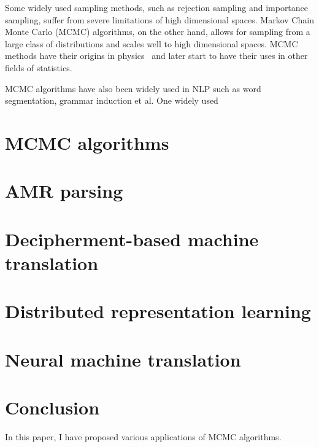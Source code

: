 \documentclass[12pt,leqno]{report}
\begin{document}
\begin{CJK}{UTF8}{cyberbit}
Some widely used sampling methods, such as rejection sampling and importance sampling, suffer from severe limitations of high dimensional spaces. Markov Chain Monte Carlo (MCMC)
algorithms, on the other hand, allows for sampling from a large class of distributions and scales well to high dimensional spaces. MCMC methods have their origins in physics~\cite{metropolis1949monte} and later start to have
their uses in other fields of statistics.


MCMC algorithms have also been widely used in NLP such as word segmentation, grammar induction et al. One widely used 
\break

\chapter{MCMC algorithms}
\label{chap:MCMC}

\break

\chapter{AMR parsing}
\label{chap:amr}

\break

\chapter{Decipherment-based machine translation}
\label{chap:decipher}

\break

\chapter{Distributed representation learning}
\label{chap:embedding}

\break

\chapter{Neural machine translation}
\label{chap:nmt}

\break
\chapter{Conclusion}
\label{chap:conclusion}
In this paper, I have proposed various applications of MCMC algorithms.
\break



\appendix
\end{CJK}
\end{document}
